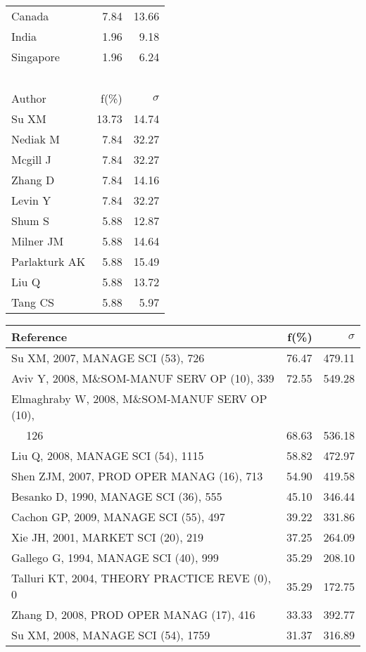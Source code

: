 \documentclass[a4paper,11pt]{report}
\begin{document}
\begin{landscape}
\begin{table}[!ht]
{\begin{tabular}{|l r r|}
Canada & 7.84 & 13.66\\
India & 1.96 & 9.18\\
Singapore & 1.96 & 6.24\\
 &  & \\
 &  & \\
 &  & \\
 &  & \\
 &  & \\
\hline
\hline
Author & f(\%) & $\sigma$\\
\hline
Su XM & 13.73 & 14.74\\
Nediak M & 7.84 & 32.27\\
Mcgill J & 7.84 & 32.27\\
Zhang D & 7.84 & 14.16\\
Levin Y & 7.84 & 32.27\\
Shum S & 5.88 & 12.87\\
Milner JM & 5.88 & 14.64\\
Parlakturk AK & 5.88 & 15.49\\
Liu Q & 5.88 & 13.72\\
Tang CS & 5.88 & 5.97\\
\hline
\end{tabular}
}
{\scriptsize\begin{tabular}{|l r r|}
\hline
Reference & f(\%) & $\sigma$\\
\hline
Su XM, 2007, MANAGE SCI (53), 726 & 76.47 & 479.11\\
Aviv Y, 2008, M\&SOM-MANUF SERV OP (10), 339 & 72.55 & 549.28\\
Elmaghraby W, 2008, M\&SOM-MANUF SERV OP (10), &  & \\
$\quad$ 126 & 68.63 & 536.18\\
Liu Q, 2008, MANAGE SCI (54), 1115 & 58.82 & 472.97\\
Shen ZJM, 2007, PROD OPER MANAG (16), 713 & 54.90 & 419.58\\
Besanko D, 1990, MANAGE SCI (36), 555 & 45.10 & 346.44\\
Cachon GP, 2009, MANAGE SCI (55), 497 & 39.22 & 331.86\\
Xie JH, 2001, MARKET SCI (20), 219 & 37.25 & 264.09\\
Gallego G, 1994, MANAGE SCI (40), 999 & 35.29 & 208.10\\
Talluri KT, 2004, THEORY PRACTICE REVE (0), 0 & 35.29 & 172.75\\
Zhang D, 2008, PROD OPER MANAG (17), 416 & 33.33 & 392.77\\
Su XM, 2008, MANAGE SCI (54), 1759 & 31.37 & 316.89\\

\end{tabular}}
\end{table}
\end{landscape}
\end{document}
